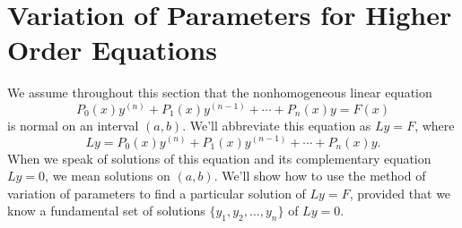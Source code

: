 \section{Variation of Parameters for Higher Order Equations}

\noindent
{}

\noindent
We assume throughout this section that the nonhomogeneous linear equation
\begin{equation}
  \label{eq:9.4.1}P_{0}(x)y^{(n)}+P_{1}(x)y^{(n-1)}+\cdots+P_{n}(x)y=F(x)
\end{equation}
is normal on an interval $(a,b)$. We'll abbreviate this equation as $Ly=F$, where
\[
  Ly=P_{0}(x)y^{(n)}+P_{1}(x)y^{(n-1)}+\cdots+P_{n}(x)y.
\]
When we speak of solutions of this equation and its complementary equation $Ly=0$, we mean solutions
on $(a,b)$. We'll show how to use the method of variation of parameters to find a particular
solution of $Ly=F$, provided that we know a fundamental set of solutions
$\{y_{1},y_{2},\dots,y_{n}\}$ of $Ly=0$.

